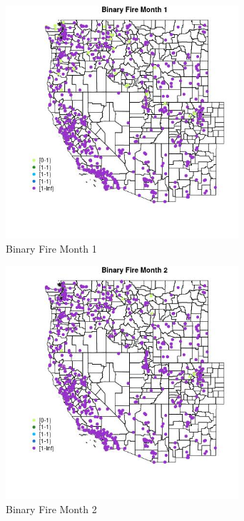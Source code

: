 \begin{figure} 
\centering  
\includegraphics[width=0.77\textwidth]{Code_Outputs/Report_ML_input_PM25_Step4_part_f_de_duplicated_aves_prioritize_24hr_obswNAs_MapObsMo1Binary_Fire.jpg} 
\caption{\label{fig:Report_ML_input_PM25_Step4_part_f_de_duplicated_aves_prioritize_24hr_obswNAsMapObsMo1Binary_Fire}Binary Fire Month 1} 
\end{figure} 
 

\begin{figure} 
\centering  
\includegraphics[width=0.77\textwidth]{Code_Outputs/Report_ML_input_PM25_Step4_part_f_de_duplicated_aves_prioritize_24hr_obswNAs_MapObsMo2Binary_Fire.jpg} 
\caption{\label{fig:Report_ML_input_PM25_Step4_part_f_de_duplicated_aves_prioritize_24hr_obswNAsMapObsMo2Binary_Fire}Binary Fire Month 2} 
\end{figure} 
 

